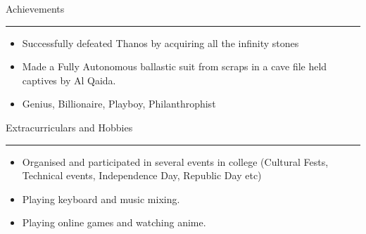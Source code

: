 \documentclass[10pt, hidelinks]{article}
\begin{document}

	{\large\color{RoyalBlue}Achievements}
	\par\noindent\rule[7pt]{\textwidth}{0.1pt}
	\vspace*{-10mm}
	\begin{itemize}
		\itemsep-0.3em
		\item Successfully defeated Thanos by acquiring all the infinity stones
		\item Made a Fully Autonomous ballastic suit from scraps in a cave file held captives by Al Qaida.
		\item Genius, Billionaire, Playboy, Philanthrophist
	\end{itemize}

	{\large\color{RoyalBlue}Extracurriculars and Hobbies}
	\par\noindent\rule[7pt]{\textwidth}{0.1pt}
	\vspace*{-10mm}
	\begin{itemize}
		\itemsep-0.3em
		\item Organised and participated in several events in college (Cultural Fests, Technical events, Independence Day, Republic Day etc)
		\item Playing keyboard and music mixing.
		\item Playing online games and watching anime.
	\end{itemize}
\end{document}
